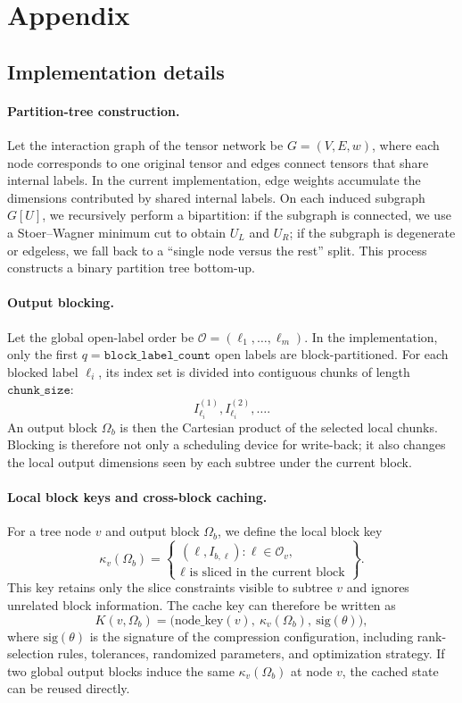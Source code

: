 \section{Appendix}

\subsection{Implementation details}
\label{app:method-details}

\paragraph{Partition-tree construction.}
Let the interaction graph of the tensor network be $G=(V,E,w)$, where each node corresponds to one original tensor and edges connect tensors that share internal labels. In the current implementation, edge weights accumulate the dimensions contributed by shared internal labels. On each induced subgraph $G[U]$, we recursively perform a bipartition: if the subgraph is connected, we use a Stoer--Wagner minimum cut to obtain $U_L$ and $U_R$; if the subgraph is degenerate or edgeless, we fall back to a ``single node versus the rest'' split. This process constructs a binary partition tree bottom-up.

\paragraph{Output blocking.}
Let the global open-label order be $\mathcal O=(\ell_1,\ldots,\ell_m)$. In the implementation, only the first $q=\texttt{block\_label\_count}$ open labels are block-partitioned. For each blocked label $\ell_i$, its index set is divided into contiguous chunks of length $\texttt{chunk\_size}$:
\[
I_{\ell_i}^{(1)}, I_{\ell_i}^{(2)}, \ldots.
\]
An output block $\Omega_b$ is then the Cartesian product of the selected local chunks. Blocking is therefore not only a scheduling device for write-back; it also changes the local output dimensions seen by each subtree under the current block.

\paragraph{Local block keys and cross-block caching.}
For a tree node $v$ and output block $\Omega_b$, we define the local block key
\[
\kappa_v(\Omega_b)
=
\left\{
\begin{array}{l}
(\ell, I_{b,\ell}) : \ell \in \mathcal O_v,\\
\ell \text{ is sliced in the current block}
\end{array}
\right\}.
\]
This key retains only the slice constraints visible to subtree $v$ and ignores unrelated block information. The cache key can therefore be written as
\[
K(v,\Omega_b)
=
\bigl(\mathrm{node\_key}(v),\ \kappa_v(\Omega_b),\ \mathrm{sig}(\theta)\bigr),
\]
where $\mathrm{sig}(\theta)$ is the signature of the compression configuration, including rank-selection rules, tolerances, randomized parameters, and optimization strategy. If two global output blocks induce the same $\kappa_v(\Omega_b)$ at node $v$, the cached state can be reused directly.


